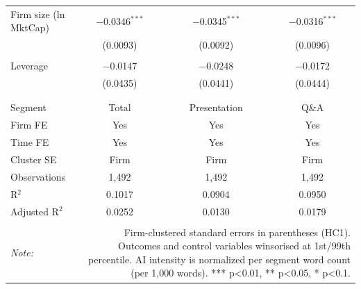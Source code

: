 \begin{table}[!htbp]
\begin{tabular}{@{\extracolsep{5pt}}lccc}
 Firm size (ln MktCap) & $-$0.0346$^{***}$ & $-$0.0345$^{***}$ & $-$0.0316$^{***}$ \\ 
  & (0.0093) & (0.0092) & (0.0096) \\ 
  & & & \\ 
 Leverage & $-$0.0147 & $-$0.0248 & $-$0.0172 \\ 
  & (0.0435) & (0.0441) & (0.0444) \\ 
  & & & \\ 
\hline \\[-1.8ex] 
Segment & Total & Presentation & Q\&A \\ 
Firm FE & Yes & Yes & Yes \\ 
Time FE & Yes & Yes & Yes \\ 
Cluster SE & Firm & Firm & Firm \\ 
Observations & 1,492 & 1,492 & 1,492 \\ 
R$^{2}$ & 0.1017 & 0.0904 & 0.0950 \\ 
Adjusted R$^{2}$ & 0.0252 & 0.0130 & 0.0179 \\ 
\hline 
\hline \\[-1.8ex] 
\textit{Note:}  & \multicolumn{3}{r}{Firm-clustered standard errors in parentheses (HC1). Outcomes and control variables winsorised at 1st/99th percentile. AI intensity is normalized per segment word count (per 1,000 words). *** p<0.01, ** p<0.05, * p<0.1.} \\ 
\end{tabular} 
\end{table} 
